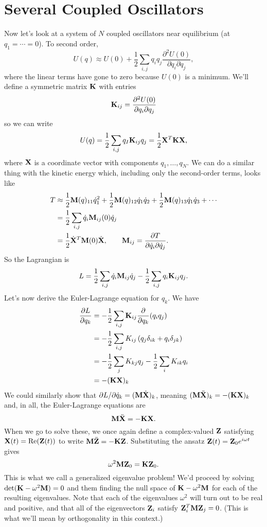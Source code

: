 \documentclass[../p111main.tex]{subfiles}
\begin{document}
\section{Several Coupled Oscillators}
Now let's look at a system of $N$ coupled oscillators near equilibrium (at $q_1 = \cdots = 0$).
To second order,
\[ U(q) \approx U(0) + \frac{1}{2} \sum_{i,j}^{} q_i q_j \frac{\partial^2 U(0)}{\partial q_i \partial q_j}, \]
where the linear terms have gone to zero because $U(0)$ is a minimum.
We'll define a symmetric matrix $\mathbf{K}$ with entries
\[ \mathbf{K}_{ij} = \frac{\partial^2 U(0)}{\partial q_i \partial q_j} \]
so we can write
\[ U(q) = \frac{1}{2} \sum_{i,j}^{} q_I \mathbf{K}_{ij} q_j = \frac{1}{2} \mathbf{X}^T \mathbf{K} \mathbf{X}, \]
where $\mathbf{X}$ is a coordinate vector with components $q_1, \ldots, q_N$.
We can do a similar thing with the kinetic energy which, including only the second-order terms, looks like
\begin{align*}
    T &\approx \frac{1}{2} \mathbf{M}(q)_{11} \dot q_1^2 + \frac{1}{2} \mathbf{M}(q)_{12} \dot q_1 \dot q_2 + \frac{1}{2} \mathbf{M}(q)_{13} \dot q_1 \dot q_3 + \cdots \\
    &= \frac{1}{2} \sum_{i,j}^{} \dot q_i \mathbf{M}_{ij}(0) \dot q_j \\
    &= \frac{1}{2} \dot{\mathbf{X}}^T \mathbf{M}(0) \dot{\mathbf{X}}, \qquad \mathbf{M}_{ij} = \frac{\partial T}{\partial \dot q_i \partial \dot q_j}.
\end{align*}
So the Lagrangian is
\[ L = \frac{1}{2} \sum_{i,j}^{} \dot q_i \mathbf{M}_{ij} \dot q_j - \frac{1}{2} \sum_{i,j}^{} q_i \mathbf{K}_{ij} q_j. \]
Let's now derive the Euler-Lagrange equation for $q_k$.
We have
\begin{align*}
    \frac{\partial L}{\partial q_k} &= -\frac{1}{2} \sum_{i,j}^{} \mathbf{K}_{ij} \frac{\partial}{\partial q_k} (q_i q_j) \\
    &= -\frac{1}{2} \sum_{i,j}^{} K_{ij} \left( q_j \delta_{ik} + q_i \delta_{jk} \right) \\
    &= -\frac{1}{2} \sum_{j}^{} K_{kj} q_j - \frac{1}{2} \sum_{i}^{} K_{ik} q_i \\
    &= -(\mathbf{K} \mathbf{X})_k
\end{align*}
We could similarly show that $\partial L / \partial \dot q_k = (\mathbf{M} \dot{\mathbf{X}})_k$, meaning $(\mathbf{M} \ddot{\mathbf{X}})_k = -(\mathbf{K} \mathbf{X})_k$ and, in all, the Euler-Lagrange equations are
\[ \mathbf{M} \ddot{\mathbf{X}} = -\mathbf{K} \mathbf{X}. \]
When we go to solve these, we once again define a complex-valued $\mathbf{Z}$ satisfying $\mathbf{X}(t) = \textrm{Re}(\mathbf{Z}(t))$ to write $\mathbf{M} \ddot{\mathbf{Z}} = -\mathbf{K} \mathbf{Z}$.
Substituting the ansatz $\mathbf{Z}(t) = \mathbf{Z}_0 e^{i \omega t}$ gives
\[ \omega^2 \mathbf{M} \mathbf{Z}_0 = \mathbf{K} \mathbf{Z}_0 .\]
This is what we call a generalized eigenvalue problem!
We'd proceed by solving $\det (\mathbf{K} - \omega^2 \mathbf{M}) = 0$ and them finding the null space of $\mathbf{K} - \omega^2 \mathbf{M}$ for each of the resulting eigenvalues.
Note that each of the eigenvalues $\omega^2$ will turn out to be real and positive, and that all of the eigenvectors $\mathbf{Z}_i$ satisfy $\mathbf{Z}_i^T \mathbf{M} \mathbf{Z}_j = 0$.
(This is what we'll mean by orthogonality in this context.)
\end{document}
